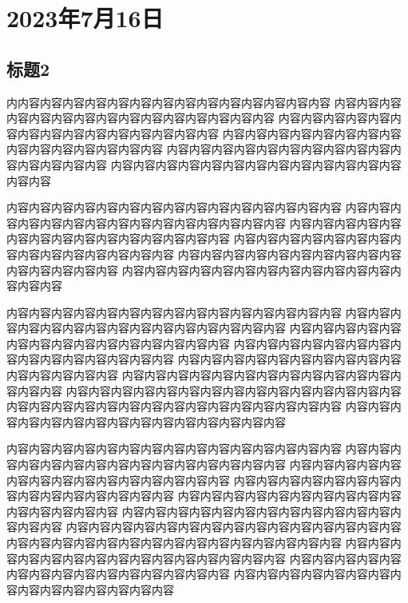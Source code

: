 \chapter*{2023年7月16日}
\section*{标题2}
\label{section:B}
内内容内容内容内容内容内容内容内容内容内容内容内容内容内容
内容内容内容内容内容内容内容内容内容内容内容内容内容内容内容
内容内容内容内容内容内容内容内容内容内容内容内容内容内容内容
内容内容内容内容内容内容内容内容内容内容内容内容内容内容内容
内容内容内容内容内容内容内容内容内容内容内容内容内容内容内容
内容内容内容内容内容内容内容内容内容内容内容内容内容内容内容

内容内容内容内容内容内容内容内容内容内容内容内容内容内容内容
内容内容内容内容内容内容内容内容内容内容内容内容内容内容内容
内容内容内容内容内容内容内容内容内容内容内容内容内容内容内容
内容内容内容内容内容内容内容内容内容内容内容内容内容内容内容
内容内容内容内容内容内容内容内容内容内容内容内容内容内容内容
内容内容内容内容内容内容内容内容内容内容内容内容内容内容内容

内容内容内容内容内容内容内容内容内容内容内容内容内容内容内容
内容内容内容内容内容内容内容内容内容内容内容内容内容内容内容
内容内容内容内容内容内容内容内容内容内容内容内容内容内容内容
内容内容内容内容内容内容内容内容内容内容内容内容内容内容内容
内容内容内容内容内容内容内容内容内容内容内容内容内容内容内容
内容内容内容内容内容内容内容内容内容内容内容内容内容内容内容
内容内容内容内容内容内容内容内容内容内容内容内容内容内容内容
内容内容内容内容内容内容内容内容内容内容内容内容内容内容内容
内容内容内容内容内容内容内容内容内容内容内容内容内容内容内容

内容内容内容内容内容内容内容内容内容内容内容内容内容内容内容
内容内容内容内容内容内容内容内容内容内容内容内容内容内容内容
内容内容内容内容内容内容内容内容内容内容内容内容内容内容内容
内容内容内容内容内容内容内容内容内容内容内容内容内容内容内容
内容内容内容内容内容内容内容内容内容内容内容内容内容内容内容
内容内容内容内容内容内容内容内容内容内容内容内容内容内容内容
内容内容内容内容内容内容内容内容内容内容内容内容内容内容内容
内容内容内容内容内容内容内容内容内容内容内容内容内容内容内容
内容内容内容内容内容内容内容内容内容内容内容内容内容内容内容
内容内容内容内容内容内容内容内容内容内容内容内容内容内容内容
内容内容内容内容内容内容内容内容内容内容内容内容内容内容内容